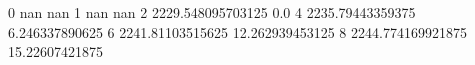 0 nan nan
1 nan nan
2 2229.548095703125 0.0
4 2235.79443359375 6.246337890625
6 2241.81103515625 12.262939453125
8 2244.774169921875 15.22607421875
